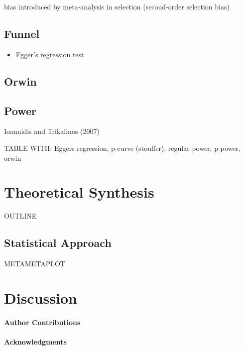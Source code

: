 \documentclass[american,floatsintext,man]{apa6}
\newcounter{author}
\begin{document}
bias introduced by meta-analysis in selection (second-order selection
bias)

\subsection{Funnel}\label{funnel}

\begin{itemize}
\itemsep1pt\parskip0pt
\item
  Egger's regression test
\end{itemize}

\subsection{Orwin}\label{orwin}

\subsection{Power}\label{power}

Ioannidis and Trikalinos (2007)

TABLE WITH: Eggers regression, p-curve (stouffer), regular power,
p-power, orwin

\section{Theoretical Synthesis}\label{theoretical-synthesis}

OUTLINE

\subsection{Statistical Approach}\label{statistical-approach}

METAMETAPLOT

\section{Discussion}\label{discussion}

\paragraph{Author Contributions}\label{author-contributions}

\paragraph{Acknowledgments}\label{acknowledgments}
\end{document}
